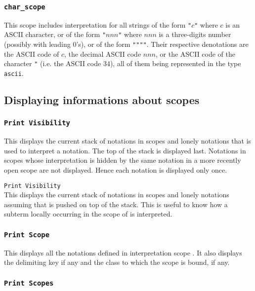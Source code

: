 \subsubsection{\tt char\_scope}

This scope includes interpretation for all strings of the form
\verb!"!$c$\verb!"! where $c$ is an ASCII character, or of the form
\verb!"!$nnn$\verb!"! where $nnn$ is a three-digits number (possibly
with leading 0's), or of the form \verb!""""!. Their respective
denotations are the ASCII code of $c$, the decimal ASCII code $nnn$,
or the ASCII code of the character \verb!"! (i.e. the ASCII code
34), all of them being represented in the type {\tt ascii}.

\subsection{Displaying informations about scopes}

\subsubsection{\tt Print Visibility}

This displays the current stack of notations in scopes and lonely
notations that is used to interpret a notation. The top of the stack
is displayed last. Notations in scopes whose interpretation is hidden
by the same notation in a more recently open scope are not
displayed. Hence each notation is displayed only once.

\variant

{\tt Print Visibility {\scope}}\\

This displays the current stack of notations in scopes and lonely
notations assuming that {\scope} is pushed on top of the stack.  This
is useful to know how a subterm locally occurring in the scope of
{\scope} is interpreted.

\subsubsection{\tt Print Scope {\scope}}

This displays all the notations defined in interpretation scope
{\scope}.  It also displays the delimiting key if any and the class to
which the scope is bound, if any.

\subsubsection{\tt Print Scopes}

